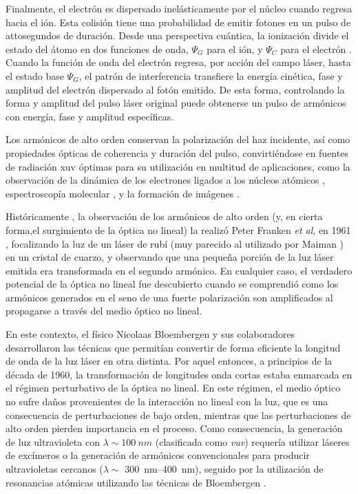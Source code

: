 Finalmente, el electrón es dispersado inelásticamente por el núcleo cuando regresa hacia el ión. Esta colisión tiene una probabilidad de emitir fotones en un pulso de attosegundos de duración. Desde una perspectiva cuántica, la ionización divide el estado del átomo en dos funciones de onda, $\Psi_{G}$ para el ión, y $\Psi_{C}$ para el electrón \autocite{Krausz2009}. Cuando la función de onda del electrón regresa, por acción del campo láser, hasta el estado base $\Psi_{G}$, el patrón de interferencia transfiere la energía cinética, fase y amplitud del electrón dispersado al fotón emitido. De esta forma, controlando la forma y amplitud del pulso láser original puede obtenerse un pulso de armónicos con energía, fase y amplitud específicas.

Los armónicos de alto orden conservan la polarización del haz incidente, así como propiedades ópticas de coherencia y duración del pulso, convirtiéndose en fuentes de radiación \acrshort{xuv} óptimas para su utilización en multitud de aplicaciones, como la observación de la dinámica de los electrones ligados a los núcleos atómicos \autocite{Hentschel2001}, espectroscopía molecular \autocite{Li2008}, y la formación de imágenes \autocite{Ravasio2009}.

Históricamente \autocite{Popmintchev2010}, la observación de los armónicos de alto orden (y, en cierta forma,el surgimiento de la óptica no lineal) la realizó Peter Franken \emph{et al}, en 1961 \autocite{Franken1961}, focalizando la luz de un láser de rubí (muy parecido al utilizado por Maiman \autocite{Maiman1960}) en un cristal de cuarzo, y observando que una pequeña porción de la luz láser emitida era transformada en el segundo armónico. En cualquier caso, el verdadero potencial de la óptica no lineal fue descubierto \autocite{Bloembergen1982} cuando se comprendió como los armónicos generados en el seno de una fuerte polarización son amplificados al propagarse a través del medio óptico no lineal.

En este contexto, el físico Nicolaas Bloembergen y sus colaboradores \autocite{Armstrong1962} desarrollaron las técnicas que permitían convertir de forma eficiente la longitud de onda de la luz láser en otra distinta. Por aquel entonces, a principios de la década de 1960, la transformación de longitudes onda cortas estaba enmarcada en el régimen perturbativo de la óptica no lineal. En este régimen, el medio óptico no sufre daños provenientes de la interacción no lineal con la luz, que es una consecuencia de perturbaciones de bajo orden, mientras que las perturbaciones de alto orden pierden importancia en el proceso. Como consecuencia, la generación de luz ultravioleta con $\lambda \sim \qty{100}{nm}$ (clasificada como \emph{\acrfull{vuv}}) requería utilizar láseres de excímeros o la generación de armónicos convencionales para producir ultravioletas cercanos ($\lambda \sim$ \qtyrange{300}{400}{nm}), seguido por la utilización de resonancias atómicas utilizando las técnicas de Bloembergen \autocite{Popmintchev2010}.

